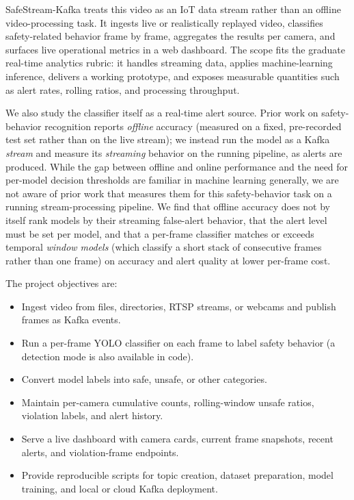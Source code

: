 \documentclass[conference]{IEEEtran}
\begin{document}
SafeStream-Kafka treats this video as an IoT data stream rather than an offline video-processing task. It ingests live or realistically replayed video, classifies safety-related behavior frame by frame, aggregates the results per camera, and surfaces live operational metrics in a web dashboard. The scope fits the graduate real-time analytics rubric: it handles streaming data, applies machine-learning inference, delivers a working prototype, and exposes measurable quantities such as alert rates, rolling ratios, and processing throughput.

We also study the classifier itself as a real-time alert source. Prior work on safety-behavior recognition reports \emph{offline} accuracy (measured on a fixed, pre-recorded test set rather than on the live stream); we instead run the model as a Kafka \emph{stream} and measure its \emph{streaming} behavior on the running pipeline, as alerts are produced. While the gap between offline and online performance and the need for per-model decision thresholds are familiar in machine learning generally, we are not aware of prior work that measures them for this safety-behavior task on a running stream-processing pipeline. We find that offline accuracy does not by itself rank models by their streaming false-alert behavior, that the alert level must be set per model, and that a per-frame classifier matches or exceeds temporal \emph{window models} (which classify a short stack of consecutive frames rather than one frame) on accuracy and alert quality at lower per-frame cost.

The project objectives are:

\begin{itemize}
\item Ingest video from files, directories, RTSP streams, or webcams and publish frames as Kafka events.
\item Run a per-frame YOLO classifier on each frame to label safety behavior (a detection mode is also available in code).
\item Convert model labels into safe, unsafe, or other categories.
\item Maintain per-camera cumulative counts, rolling-window unsafe ratios, violation labels, and alert history.
\item Serve a live dashboard with camera cards, current frame snapshots, recent alerts, and violation-frame endpoints.
\item Provide reproducible scripts for topic creation, dataset preparation, model training, and local or cloud Kafka deployment.
\end{itemize}
\end{document}
